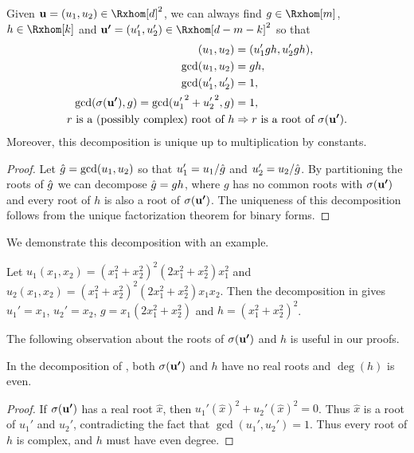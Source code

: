 \documentclass[final,onefignum,onetabnum]{siamart220329}
\begin{document}
\begin{proposition} \label{prop:decomp} Given
  $\vecp{u} = (u_1, u_2) \in \Rxhom[d]^2$, we can always find $g \in \Rxhom[m]$,
  $h \in \Rxhom[k]$ and $\vecp{u'} = (u_1', u_2') \in \Rxhom[d-m-k]^2$ so that
  \begin{align*}
    (u_1, u_2) &= (u_1'gh, u_2'gh), \\
    \gcd(u_1, u_2) &= gh, \\
    \gcd(u_1', u_2') &= 1, \\
     \gcd(\sigma(\boldsymbol{\mathbf{u'}}), g) = \gcd({u_1'}^2 + {u_2'}^2, g) &= 1, \\
    r \text{ is a (possibly complex) root of } h & \Rightarrow r \text{ is a root of } \sigma(\boldsymbol{\mathbf{u'}}).
  \end{align*}
  Moreover, this decomposition is unique up to multiplication by constants.
  \begin{proof}
    Let $\hat{g} = \gcd(u_1, u_2)$ so that $u_1' = u_1/\hat{g}$ and $u_2' = u_2/\hat{g}$. By
    partitioning the roots of $\hat{g}$ we can decompose $\hat{g} = gh$, where $g$ has no
    common roots with $\sigma(\boldsymbol{\mathbf{u'}})$ and every root of $h$ is also a root of
    $\sigma(\boldsymbol{\mathbf{u'}})$. The uniqueness of this decomposition follows from the
    unique factorization theorem for binary forms.
  \end{proof}
\end{proposition}

We demonstrate this decomposition with an example.
\begin{example} \label{ex:h_not_1} Let
  $u_1(x_1,x_2) = (x_1^2 + x_2^2)^2 (2x_1^2 + x_2^2) x_1^2$ and
  $u_2(x_1,x_2) = (x_1^2 + x_2^2)^2 (2x_1^2 + x_2^2) x_1 x_2$. Then the
  decomposition in  gives $u_1' = x_1$, $u_2' = x_2$,
  $g = x_1 (2x_1^2 + x_2^2)$ and $h = (x_1^2 + x_2^2)^2$.
\end{example}

The following observation about the roots of $\sigma(\boldsymbol{\mathbf{u'}})$ and $h$ is useful
in our proofs.
\begin{proposition} \label{prop:no-real-roots} In the decomposition of
  , both $\sigma(\boldsymbol{\mathbf{u'}})$ and $h$ have no real roots and
  $\deg(h)$ is even.
  \begin{proof}
    If $\sigma(\boldsymbol{\mathbf{u'}})$ has a real root $\hat{x}$, then
    $u_1'(\hat x)^2 + u_2'(\hat x)^2 = 0$. Thus $\hat{x}$ is a root of $u_1'$
    and $u_2'$, contradicting the fact that $\gcd(u_1', u_2') = 1$. Thus every
    root of $h$ is complex, and $h$ must have even degree.
  \end{proof}
\end{proposition}
\end{document}
